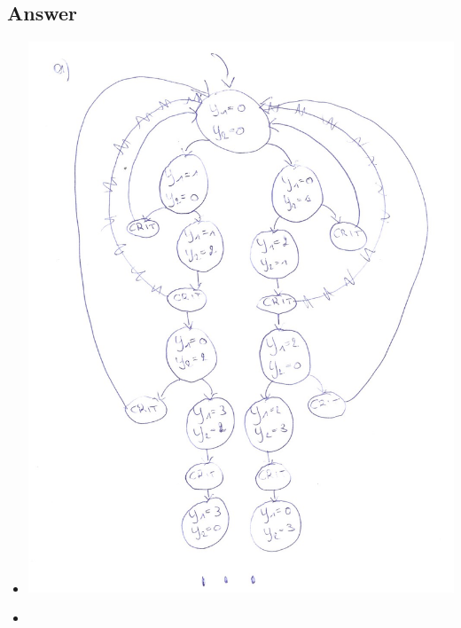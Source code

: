 \documentclass[12pt]{article}
\begin{document}
\subsection*{Answer}
\begin{itemize}
	\item \begin{centering}
		\includegraphics*[scale=1]{29a.jpg}
	\end{centering}
	\item \begin{centering}

\end{centering}
\end{itemize}
\end{document}

